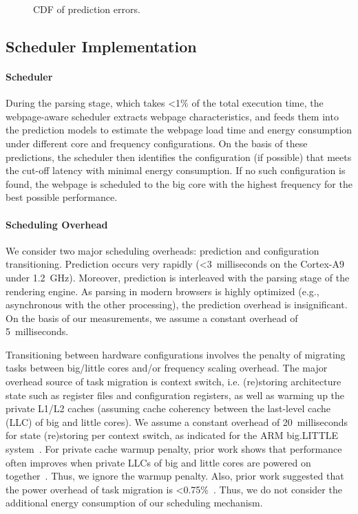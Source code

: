\begin{figure}[t]
\hspace*{15pt}
\caption{CDF of prediction errors.}
\label{fig:model_eval}
\end{figure}

\subsection{Scheduler Implementation}
\label{sec:runtime:load:sched}

\paragraph{Scheduler} During the parsing stage, which takes \textless 1\% of the total execution time, the webpage-aware scheduler extracts webpage characteristics, and feeds them into the prediction models to estimate the webpage load time and energy consumption under different core and frequency configurations.  On the basis of these predictions, the scheduler then identifies the configuration (if possible) that meets the cut-off latency with minimal energy consumption. If no such configuration is found, the webpage is scheduled to the big core with the highest frequency for the best possible performance.

\paragraph{Scheduling Overhead} We consider two major scheduling overheads: prediction and configuration transitioning. Prediction occurs very rapidly (\textless 3~milliseconds on the Cortex-A9 under 1.2~GHz). Moreover, prediction is interleaved with the parsing stage of the rendering engine. As parsing in modern browsers is highly optimized (e.g., asynchronous with the other processing), the prediction overhead is insignificant. On the basis of our measurements, we assume a constant overhead of 5~milliseconds.

Transitioning between hardware configurations involves the penalty of migrating tasks between big/little cores and/or frequency scaling overhead. The major overhead source of task migration is context switch, i.e. (re)storing architecture state such as register files and configuration registers, as well as warming up the private L1/L2 caches (assuming cache coherency between the last-level cache (LLC) of big and little cores). We assume a constant overhead of 20~milliseconds for state (re)storing per context switch, as indicated for the ARM big.LITTLE system~\cite{big.little}. For private cache warmup penalty, prior work shows that performance often improves when private LLCs of big and little cores are powered on together~\cite{PIE}. Thus, we ignore the warmup penalty. Also, prior work suggested that the power overhead of task migration is \textless 0.75\%~\cite{tm}. Thus, we do not consider the additional energy consumption of our scheduling mechanism.

